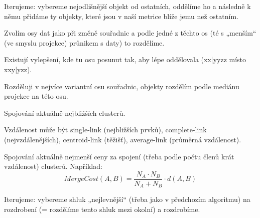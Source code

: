 \documentclass[12pt]{article}					%
\begin{document}
    \begin{definice}
        Iterujeme: vybereme nejodlišnější objekt od ostatních, oddělíme ho a následně k němu přidáme ty objekty, které jsou v naší metrice blíže jemu než ostatním.
    \end{definice}

    \begin{definice}
        Zvolím osy dat jako při změně souřadnic a podle jedné z těchto os (té s „menším“ (ve smyslu projekce) průnikem s daty) to rozdělíme.

        Existují vylepšení, kde tu osu posunut tak, aby lépe oddělovala (xx|yyzz místo xxy|yzz).
    \end{definice}

    \begin{definice}
        Rozděluji v nejvíce variantní osu souřadnic, objekty rozdělím podle mediánu projekce na této osu.
    \end{definice}

    \begin{definice}
        Spojování aktuálně nejbližších clusterů.

        Vzdálenost může být single-link (nejbližších prvků), complete-link (nejvzdálenějších), centroid-link (těžišť), average-link (průměrná vzdálenost).
    \end{definice}

    \begin{definice}
        Spojování aktuálně nejmenší ceny za spojení (třeba podle počtu členů krát vzdálenost) clusterů. Například:
        $$ MergeCost(A, B) = \frac{N_A·N_B}{N_A + N_B}·d(A, B) $$ 
    \end{definice}

    \begin{definice}
            Iterujeme: vybereme shluk „nejlevnější“ (třeba jako v předchozím algoritmu) na rozdrobení (= rozdělíme tento shluk mezi okolní) a rozdrobíme.
    \end{definice}
\end{document}
